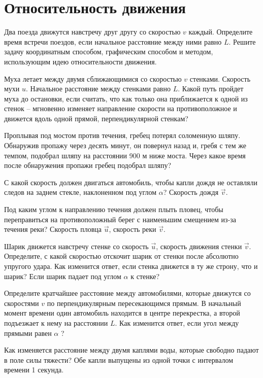 \section{Относительность движения}

\AddProb Два поезда движутся навстречу друг другу со скоростью $v$ каждый. 
Определите время встречи поездов, если начальное расстояние между ними равно $L$. 
Решите задачу координатным способом, графическим способом и методом, использующим идею относительности движения.

\AddProb Муха летает между двумя сближающимися со скоростью $v$ стенками. 
Скорость мухи $u$. Начальное расстояние между стенками равно $L$. 
Какой путь пройдет муха до остановки, если считать, что как только она приближается к одной из стенок -- мгновенно изменяет 
направление скорости на противоположное и движется вдоль одной прямой, перпендикулярной стенкам?

\AddProb Проплывая под мостом против течения, гребец потерял соломенную шляпу. 
Обнаружив пропажу через десять минут, он повернул назад и, гребя с тем же темпом, подобрал шляпу на расстоянии 900 м ниже моста. 
Через какое время после обнаружения пропажи гребец подобрал шляпу?

\AddProb С какой скорость должен двигаться автомобиль, чтобы капли дождя не оставляли следов на заднем стекле, 
наклоненном под углом $ \alpha $? Скорость дождя $\vec v$.

\AddProb Под каким углом к направлению течения должен плыть пловец, 
чтобы переправиться на противоположный берег с наименьшим смещением из-за течения реки? 
Скорость пловца $\vec u$, скорость реки $\vec v$.

\AddProb Шарик движется навстречу стенке со скорость $\vec u$, скорость движения стенки $\vec v$. 
Определите, с какой скоростью отскочит шарик от стенки после абсолютно упругого удара. 
Как изменится ответ, если стенка движется в ту же строну, что и шарик? 
Если шарик падает под углом $ \alpha $ к стенке?

\AddProb Определите кратчайшее расстояние между автомобилями, которые движутся со скоростями $v$ по перпендикулярным пересекающимся прямым. 
В начальный момент времени один автомобиль находится в центре перекрестка, а второй подъезжает к нему на расстоянии $L$. 
Как изменится ответ, если угол между прямыми равен $ \alpha $ ?

\AddProb Как изменяется расстояние между двумя каплями воды, которые свободно падают в поле силы тяжести? 
Обе капли выпущены из одной точки с интервалом времени 1 секунда.

